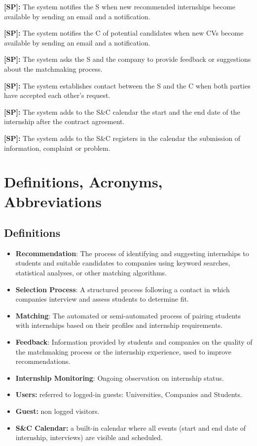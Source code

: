 \textbf{[SP\cs]:} The system notifies the S when new recommended internships become available by sending an email and a notification.

\textbf{[SP\cs]:} The system notifies the C of potential candidates when new CVs become available by sending an email and a notification.

\textbf{[SP\cs]:} The system asks the S and the company to provide feedback or suggestions about the matchmaking process.

\textbf{[SP\cs]:} The system establishes contact between the S and the C when both parties have accepted each other's request.

\textbf{[SP\cs]:} The system adds to the S\&C calendar the start and the end date of the internship after the contract agreement.

\textbf{[SP\cs]:} The system adds to the S\&C registers in the calendar the submission of information, complaint or problem.


\section{Definitions, Acronyms, Abbreviations}
\label{sec:definition_acronyms_abbreviations}%

\subsection{Definitions}
\label{subsec:definitions}%

\begin{itemize}
\item
  \textbf{Recommendation}: The process of identifying and suggesting internships to students and suitable candidates to companies using keyword searches, statistical analyses, or other matching algorithms.
\item
  \textbf{Selection Process}: A structured process following a contact in which companies interview and assess students to determine fit.
\item
  \textbf{Matching}: The automated or semi-automated process of pairing students with internships based on their profiles and internship requirements.
\item
  \textbf{Feedback}: Information provided by students and companies on the quality of the matchmaking process or the internship experience, used to improve recommendations.
\item
  \textbf{Internship Monitoring}: Ongoing observation on internship status.
\item
  \textbf{Users:} referred to logged-in guests: Universities, Companies and Students.
\item
  \textbf{Guest:} non logged visitors.
\item
  \textbf{S\&C Calendar:} a built-in calendar where all events (start and end date of internship, interviews) are visible and scheduled.
\end{itemize}

